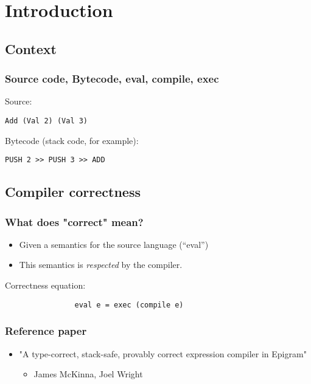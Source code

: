\section{Introduction}

    \subsection{Context}

\begin{frame}[fragile]
            \frametitle{Source code, Bytecode, eval, compile, exec}

            Source:
            \begin{verbatim}
Add (Val 2) (Val 3)
            \end{verbatim}

            Bytecode (stack code, for example):
            \begin{verbatim}
PUSH 2 >> PUSH 3 >> ADD
            \end{verbatim}
\end{frame}


    \subsection{Compiler correctness}
        \begin{frame}
            \frametitle{What does "correct" mean?}

            \begin{itemize}
                \item Given a semantics for the source language (``eval'')
                \item This semantics is \emph{respected} by the compiler.
            \end{itemize}

            Correctness equation:
            \begin{verbatim}
                eval e = exec (compile e)
            \end{verbatim}
        \end{frame}

        \begin{frame}
            \frametitle{Reference paper}
            \begin{itemize}
                \item "A type-correct, stack-safe, provably correct expression compiler in Epigram"
                    \begin{itemize}
                        \item James McKinna, Joel Wright
                    \end{itemize}
            \end{itemize}
        \end{frame}
    

